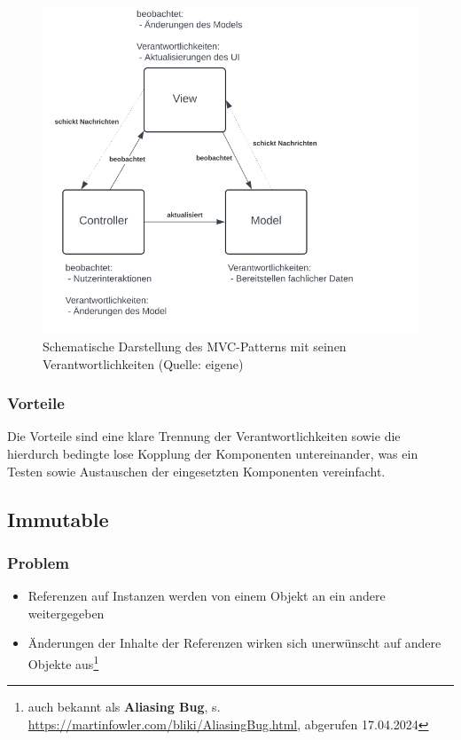 \begin{figure}
    \centering
    \includegraphics[scale=0.4]{part two/Objektorientierter Entwurf/img/mvc}
    \caption{Schematische Darstellung des MVC-Patterns mit seinen Verantwortlichkeiten (Quelle: eigene)}
    \label{fig:mvc}
\end{figure}

\subsubsection*{Vorteile}
Die Vorteile sind eine klare Trennung der Verantwortlichkeiten sowie die hierdurch bedingte lose Kopplung der Komponenten untereinander, was ein Testen sowie Austauschen der eingesetzten Komponenten vereinfacht.

\subsection{Immutable}

\subsubsection*{Problem}
\begin{itemize}
    \item Referenzen auf Instanzen werden von einem Objekt an ein andere weitergegeben
    \item Änderungen der Inhalte der Referenzen wirken sich unerwünscht auf andere Objekte aus\footnote{
    auch bekannt als \textbf{Aliasing Bug}, s. \url{https://martinfowler.com/bliki/AliasingBug.html}, abgerufen 17.04.2024
    }
\end{itemize}

